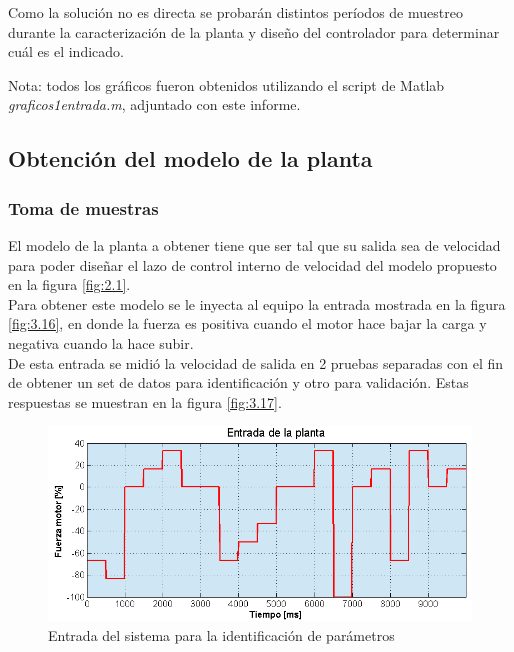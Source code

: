 Como la solución no es directa se probarán distintos períodos de muestreo durante la caracterización de la planta y diseño del controlador para determinar cuál es el indicado.

\textcolor{FIXME}{Nota: todos los gráficos fueron obtenidos utilizando el script de Matlab \textit{graficos1entrada.m}, adjuntado con este informe.}

\subsection{Obtención del modelo de la planta}
\subsubsection{Toma de muestras}
El modelo de la planta a obtener tiene que ser tal que su salida sea de velocidad para poder diseñar el lazo de control interno de velocidad del modelo propuesto en la figura \ref{fig:2.1}.\\
Para obtener este modelo se le inyecta al equipo la entrada mostrada en la figura \ref{fig:3.16}, en donde la fuerza es positiva cuando el motor hace bajar la carga y negativa cuando la hace subir.\\
De esta entrada se midió la velocidad de salida en 2 pruebas separadas con el fin de obtener un set de datos para identificación y otro para validación. Estas respuestas se muestran en la figura \ref{fig:3.17}.

\begin{figure}[!ht]
	\centering
	\includegraphics[width=16cm,scale=1]{resources/3_16-entradaIdentPlanta.png}
	\caption{Entrada del sistema para la identificación de parámetros}
	\label{fig:\thefigure}
\end{figure}

